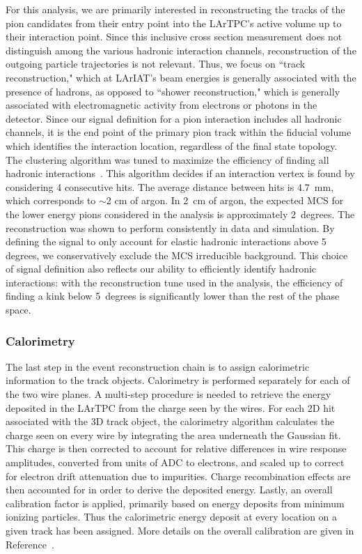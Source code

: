 \documentclass[%
 floatfix,
 reprint,
 twocolumn,
superscriptaddress,
showpacs,preprintnumbers,
 amsmath,amssymb,
 aps,
prd,
]{revtex4-1}
\begin{document}
For this analysis, we are primarily interested in reconstructing the tracks of the pion candidates from their entry point into the LArTPC's active volume up to their interaction point. Since this inclusive cross section measurement does not distinguish among the various hadronic interaction channels, reconstruction of the outgoing particle trajectories is not relevant. Thus, we focus on ``track reconstruction," which at LArIAT’s beam energies is generally associated with the presence of hadrons, as opposed to ``shower reconstruction," which is generally associated with electromagnetic activity from electrons or photons in the detector.
Since our signal definition for a pion interaction includes all hadronic channels, it is the end point of the primary pion track within the fiducial volume which identifies the interaction location, regardless of the final state topology.
The clustering algorithm was tuned to maximize the efficiency of finding all hadronic interactions~\cite{osti_1489387}.   This algorithm decides if an interaction vertex is found by considering 4 consecutive hits. The average distance between hits is 4.7~mm, which corresponds to $\sim$2 cm of argon. In 2~cm of argon, the expected MCS for the lower energy pions considered in the analysis is approximately 2~degrees. The reconstruction was shown to perform consistently in data and simulation.
By defining the signal to only account for elastic hadronic interactions above 5 degrees, we conservatively exclude the MCS irreducible background. This choice of signal definition also reflects our ability to efficiently identify hadronic interactions: with the reconstruction tune used in the analysis, the efficiency of finding a kink below 5~degrees is significantly lower than the rest of the phase space. 



\subsubsection{Calorimetry}\label{sec:Calo}
The last step in the event reconstruction chain is to assign calorimetric information to the track objects. Calorimetry is performed separately for each of the two wire planes. A multi-step procedure is needed to retrieve the energy deposited in the LArTPC from the charge seen by the wires. For each 2D hit associated with the 3D track object, the calorimetry algorithm calculates the charge seen on every wire by integrating the area underneath the Gaussian fit. This charge is then corrected to account for relative differences in wire response amplitudes, converted from units of ADC to electrons, and scaled up to correct for electron drift attenuation due to impurities. Charge recombination effects are then accounted for in order to derive the deposited energy.  Lastly, an overall calibration factor is applied, primarily based on energy deposits from minimum ionizing particles.   Thus the calorimetric energy deposit at every location on a given track has been assigned.  More details on the overall calibration are given in Reference~\cite{Acciarri_2020}.
\end{document}
